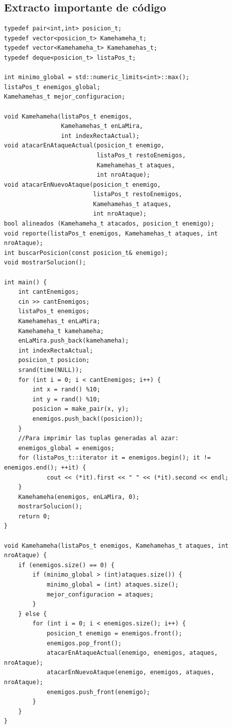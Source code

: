 \documentclass[10pt,a4paper]{article}
\begin{document}
\subsection{Extracto importante de código}
\begin{lstlisting}
typedef pair<int,int> posicion_t;
typedef vector<posicion_t> Kamehameha_t;
typedef vector<Kamehameha_t> Kamehamehas_t;
typedef deque<posicion_t> listaPos_t;

int minimo_global = std::numeric_limits<int>::max();
listaPos_t enemigos_global;
Kamehamehas_t mejor_configuracion;

void Kamehameha(listaPos_t enemigos,
                Kamehamehas_t enLaMira,
                int indexRectaActual);
void atacarEnAtaqueActual(posicion_t enemigo,
                          listaPos_t restoEnemigos,
                          Kamehamehas_t ataques,
                          int nroAtaque);
void atacarEnNuevoAtaque(posicion_t enemigo,
                         listaPos_t restoEnemigos,
                         Kamehamehas_t ataques,
                         int nroAtaque);
bool alineados (Kamehameha_t atacados, posicion_t enemigo);
void reporte(listaPos_t enemigos, Kamehamehas_t ataques, int nroAtaque);
int buscarPosicion(const posicion_t& enemigo);
void mostrarSolucion();

int main() {
    int cantEnemigos;
    cin >> cantEnemigos;
    listaPos_t enemigos;
    Kamehamehas_t enLaMira;
    Kamehameha_t kamehameha;
    enLaMira.push_back(kamehameha);
    int indexRectaActual;
	posicion_t posicion;
    srand(time(NULL));
    for (int i = 0; i < cantEnemigos; i++) {
        int x = rand() %10;
        int y = rand() %10;
    	posicion = make_pair(x, y);
    	enemigos.push_back((posicion));
    }
    //Para imprimir las tuplas generadas al azar:
    enemigos_global = enemigos;
    for (listaPos_t::iterator it = enemigos.begin(); it != enemigos.end(); ++it) {
            cout << (*it).first << " " << (*it).second << endl;
    }
    Kamehameha(enemigos, enLaMira, 0);
    mostrarSolucion();
    return 0;
}

void Kamehameha(listaPos_t enemigos, Kamehamehas_t ataques, int nroAtaque) {
    if (enemigos.size() == 0) {
        if (minimo_global > (int)ataques.size()) {
            minimo_global = (int) ataques.size();
            mejor_configuracion = ataques;
        }
    } else {
        for (int i = 0; i < enemigos.size(); i++) {
            posicion_t enemigo = enemigos.front();
            enemigos.pop_front();
            atacarEnAtaqueActual(enemigo, enemigos, ataques, nroAtaque);
            atacarEnNuevoAtaque(enemigo, enemigos, ataques, nroAtaque);
            enemigos.push_front(enemigo);
        }
    }
}


\end{lstlisting}
\end{document}
